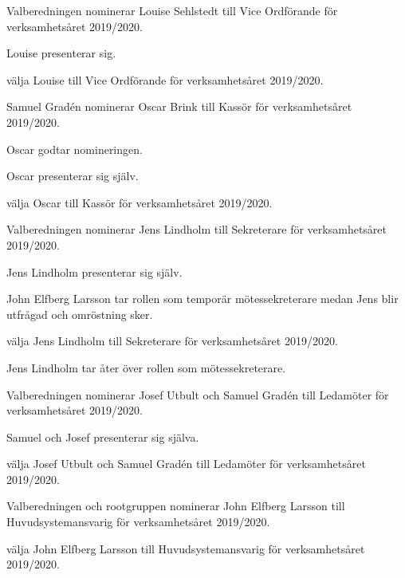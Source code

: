 \documentclass{protokoll}
\begin{document}
Valberedningen nominerar Louise Sehlstedt till Vice Ordförande för verksamhetsåret 2019/2020.

Louise presenterar sig.
\begin{beslut}
  \att välja Louise till Vice Ordförande för verksamhetsåret 2019/2020.
\end{beslut}

Samuel Gradén nominerar Oscar Brink till Kassör för verksamhetsåret 2019/2020. 

Oscar godtar nomineringen. 

Oscar presenterar sig själv.

\begin{beslut}
  \att välja Oscar till Kassör för verksamhetsåret 2019/2020.
\end{beslut}

Valberedningen nominerar Jens Lindholm till Sekreterare för verksamhetsåret 2019/2020.

Jens Lindholm presenterar sig själv.

John Elfberg Larsson tar rollen som temporär mötessekreterare medan Jens blir
utfrågad och omröstning sker.


\begin{beslut}
  \att välja Jens Lindholm till Sekreterare för verksamhetsåret 2019/2020.
\end{beslut}

Jens Lindholm tar åter över rollen som mötessekreterare.

Valberedningen nominerar Josef Utbult och Samuel Gradén till Ledamöter för 
verksamhetsåret 2019/2020.

Samuel och Josef presenterar sig själva.

\begin{beslut}
  \att välja Josef Utbult och Samuel Gradén till Ledamöter för verksamhetsåret
  2019/2020.
\end{beslut}

Valberedningen och rootgruppen nominerar John Elfberg Larsson till
Huvudsystemansvarig för verksamhetsåret 2019/2020.

\begin{beslut}
  \att välja John Elfberg Larsson till Huvudsystemansvarig för verksamhetsåret 
  2019/2020.
\end{beslut}
\end{document}
